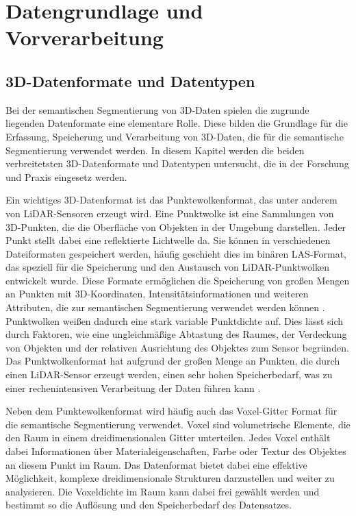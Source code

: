 \chapter{Datengrundlage und Vorverarbeitung}
\section{3D-Datenformate und Datentypen}
Bei der semantischen Segmentierung von 3D-Daten spielen die zugrunde liegenden
Datenformate eine elementare Rolle. Diese bilden die Grundlage für die
Erfassung, Speicherung und Verarbeitung von 3D-Daten, die für die semantische
Segmentierung verwendet werden. In diesem Kapitel werden die beiden
verbreitetsten 3D-Datenformate und Datentypen untersucht, die in der Forschung
und Praxis eingesetz werden.

Ein wichtiges 3D-Datenformat ist das Punktewolkenformat, das unter anderem von
LiDAR-Sensoren erzeugt wird. Eine Punktwolke ist eine Sammlungen von
3D-Punkten, die die Oberfläche von Objekten in der Umgebung darstellen. Jeder
Punkt stellt dabei eine reflektierte Lichtwelle da. Sie können in verschiedenen
Dateiformaten gespeichert werden, häufig geschieht dies im binären LAS-Format,
das speziell für die Speicherung und den Austausch von LiDAR-Punktwolken
entwickelt wurde. Diese Formate ermöglichen die Speicherung von großen Mengen
an Punkten mit 3D-Koordinaten, Intensitätsinformationen und weiteren
Attributen, die zur semantischen Segmentierung verwendet werden können
\cite{.2020b}. Punktwolken weißen dadurch eine stark variable Punktdichte auf.
Dies lässt sich durch Faktoren, wie eine ungleichmäßige Abtastung des Raumes,
der Verdeckung von Objekten und der relativen Ausrichtung des Objektes zum
Sensor begründen. Das Punktwolkenformat hat aufgrund der großen Menge an
Punkten, die durch einen LiDAR-Sensor erzeugt werden, einen sehr hohen
Speicherbedarf, was zu einer rechenintensiven Verarbeitung der Daten führen
kann \cite{8578570}.

Neben dem Punktewolkenformat wird häufig auch das Voxel-Gitter Format für die
semantische Segmentierung verwendet. Voxel sind volumetrische Elemente, die den
Raum in einem dreidimensionalen Gitter unterteilen. Jedes Voxel enthält dabei
Informationen über Materialeigenschaften, Farbe oder Textur des Objektes an
diesem Punkt im Raum. Das Datenformat bietet dabei eine effektive Möglichkeit,
komplexe dreidimensionale Strukturen darzustellen und weiter zu analysieren.
Die Voxeldichte im Raum kann dabei frei gewählt werden und bestimmt so die
Auflösung und den Speicherbedarf des Datensatzes.

